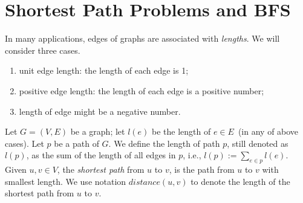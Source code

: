 \setcounter{definition}{0} \setcounter{property}{0} \setcounter{claim}{0} \setcounter{fact}{0} \setcounter{corollary}{0} \setcounter{figure}{0}
\section{Shortest Path Problems and BFS}

In many applications, edges of graphs are associated with \emph{lengths}.
We will consider three cases.
\begin{enumerate}
\item unit edge length: the length of each edge is 1;
\item positive edge length: the length of each edge is a positive number;
\item length of edge might be a negative number.
\end{enumerate}

Let $G = (V, E)$ be a graph; let $l(e)$ be the length of $e\in E$~(in any of above cases).
Let $p$ be a path of $G$. We define the length of path $p$, still denoted as $l(p)$,
as the sum of the length of all edges in $p$, i.e., $l(p) := \sum_{e\in p} l(e)$.
Given $u,v\in V$, the \emph{shortest path} from $u$ to $v$, is the path from $u$ to $v$
with smallest length. We use notation $distance(u,v)$ to denote the length
of the shortest path from $u$ to $v$.


